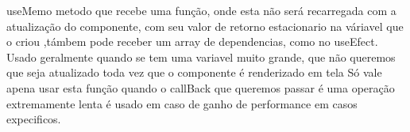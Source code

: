 useMemo
metodo que recebe uma função, onde esta não será recarregada com a atualização do componente, com seu valor de retorno estacionario na váriavel que o criou
,támbem pode receber um array de dependencias, como no useEfect.
Usado geralmente quando se tem uma variavel muito grande, que não queremos que seja atualizado toda vez que o componente é renderizado em tela
Só vale apena usar esta função quando o callBack que queremos passar é uma operação extremamente lenta
é usado em caso de ganho de performance em casos expecificos.